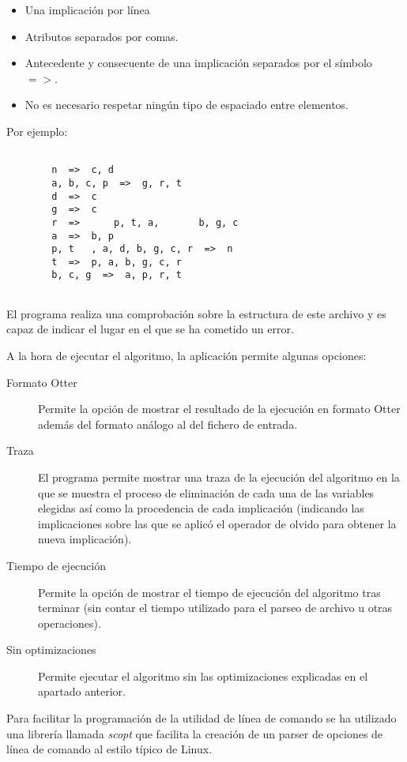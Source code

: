 	\begin{itemize}
		\item Una implicación por línea
		\item Atributos separados por comas.
		\item Antecedente y consecuente de una implicación separados por el símbolo $=>$.
		\item No es necesario respetar ningún tipo de espaciado entre elementos.
	\end{itemize}

	Por ejemplo:
	
	\begin{lstlisting}
		
		n  =>  c, d 
		a, b, c, p  =>  g, r, t 
		d  =>  c 
		g  =>  c 
		r  =>      p, t, a,       b, g, c 
		a  =>  b, p 
		p, t   , a, d, b, g, c, r  =>  n 
		t  =>  p, a, b, g, c, r 
		b, c, g  =>  a, p, r, t 
	
	\end{lstlisting}
	
	El programa realiza una comprobación sobre la estructura de este archivo y es capaz de indicar el lugar en el que se ha cometido un error.
	
	A la hora de ejecutar el algoritmo, la aplicación permite algunas opciones:
	
	\begin{description}
		\item[Formato Otter] 
			Permite la opción de mostrar el resultado de la ejecución en formato Otter además del formato análogo al del fichero de entrada.
		\item[Traza] 
			El programa permite mostrar una traza de la ejecución del algoritmo en la que se muestra el proceso de eliminación de cada una de las variables elegidas así como la procedencia de cada implicación (indicando las implicaciones sobre las que se aplicó el operador de olvido para obtener la nueva implicación).
		\item[Tiempo de ejecución] 
			Permite la opción de mostrar el tiempo de ejecución del algoritmo tras terminar (sin contar el tiempo utilizado para el parseo de archivo u otras operaciones).
		\item[Sin optimizaciones] 
			Permite ejecutar el algoritmo sin las optimizaciones explicadas en el apartado anterior.
	\end{description}

	
	Para facilitar la programación de la utilidad de línea de comando se ha utilizado una librería llamada \textit{scopt}  que facilita la creación de un parser de opciones de línea de comando al estilo típico de Linux.
	
